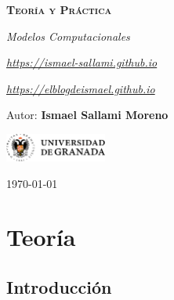 \documentclass[12pt]{report} %
\begin{document}
\begin{titlepage}
    \begin{center}
        \vspace*{2cm}
        
        {\Huge \bfseries\scshape Teoría y Práctica \par}
        \vspace{0.5cm}
        {\Large \itshape Modelos Computacionales \par}
        \vspace{0.5cm}
        {\small \itshape \href{https://ismael-sallami.github.io}{https://ismael-sallami.github.io} \par}
        {\small \itshape \href{https://elblogdeismael.github.io}{https://elblogdeismael.github.io} \par}


        \vfill
        
        {\LARGE Autor: \textbf{Ismael Sallami Moreno} \par}
        \vspace{0.3cm}
        
        \vspace{1cm}
        \includegraphics[width=0.25\textwidth]{../../../extraFiles/img/ugr.png} %
        \vspace{1cm}
        
        {\large \today}
    \end{center}
    
    \restoregeometry
\end{titlepage}


\thispagestyle{empty} %
\clearpage

\tableofcontents
\listoffigures
\clearpage

\listoftables
\clearpage
\thispagestyle{empty} %
\clearpage

\part{Teoría}

\hypertarget{introducciuxf3n}{%
\chapter{Introducción}\label{introducciuxf3n}}
\end{document}
